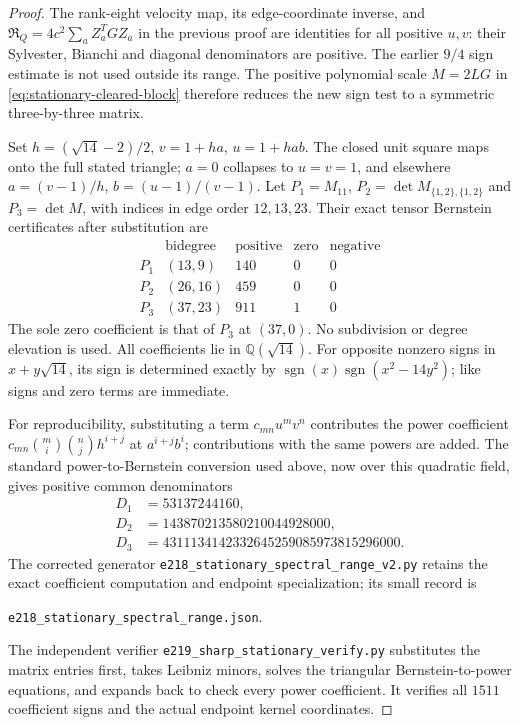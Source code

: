 \documentclass[11pt]{article}
\numberwithin{equation}{section}
\theoremstyle{definition}
\theoremstyle{remark}
\begin{document}
\begin{proof}
The rank-eight velocity map, its edge-coordinate inverse,
and \(\mathfrak R_Q=4c^2\sum_a Z_a^TGZ_a\) in the previous
proof are identities for all positive \(u,v\): their
Sylvester, Bianchi and diagonal denominators are positive.
The earlier \(9/4\) sign estimate is not used outside its
range. The positive polynomial scale
\(M=2LG\) in \eqref{eq:stationary-cleared-block} therefore
reduces the new sign test to a symmetric three-by-three matrix.

Set \(h=(\sqrt{14}-2)/2\), \(v=1+ha\), \(u=1+hab\).
The closed unit square maps onto the full stated triangle;
\(a=0\) collapses to \(u=v=1\), and elsewhere
\(a=(v-1)/h\), \(b=(u-1)/(v-1)\).
Let \(P_1=M_{11}\), \(P_2=\det M_{\{1,2\},\{1,2\}}\)
and \(P_3=\det M\), with indices in edge order \(12,13,23\).
Their exact tensor Bernstein certificates after substitution are
\[
\begin{array}{c|c|r|r|r}
 &\text{bidegree}&\text{positive}&\text{zero}&\text{negative}\\\hline
 P_1&(13,9)&140&0&0\\
 P_2&(26,16)&459&0&0\\
 P_3&(37,23)&911&1&0
\end{array}
\]
The sole zero coefficient is that of \(P_3\) at \((37,0)\).
No subdivision or degree elevation is used. All coefficients
lie in \(\mathbb Q(\sqrt{14})\). For opposite nonzero signs
in \(x+y\sqrt{14}\), its sign is determined exactly by
\(\operatorname{sgn}(x)\operatorname{sgn}(x^2-14y^2)\);
like signs and zero terms are immediate.

For reproducibility, substituting a term \(c_{mn}u^mv^n\)
contributes the power coefficient
\(c_{mn}\binom mi\binom nj h^{i+j}\) at
\(a^{i+j}b^i\); contributions with the same powers are added.
The standard power-to-Bernstein conversion
used above, now over this quadratic field, gives positive
common denominators
\[
 \begin{split}
 D_1&=53137244160,\\
 D_2&=143870213580210044928000,\\
 D_3&=4311134142332645259085973815296000.
 \end{split}
\]
The corrected generator
\texttt{e218\_stationary\_spectral\_range\_v2.py} retains the
exact coefficient computation and endpoint specialization;
its small record is
\begin{center}
\texttt{e218\_stationary\_spectral\_range.json}.
\end{center}
The independent verifier
\texttt{e219\_sharp\_stationary\_verify.py} substitutes the
matrix entries first, takes Leibniz minors, solves the
triangular Bernstein-to-power equations, and expands back to
check every power coefficient. It verifies all \(1511\)
coefficient signs and the actual endpoint kernel coordinates.


\end{proof}
\end{document}
